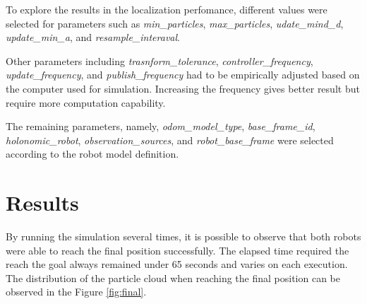 \documentclass[10pt,journal,compsoc]{IEEEtran}
\begin{document}
To explore the results in the localization perfomance, different values were selected for parameters such as \textit{min\_particles}, \textit{max\_particles}, \textit{udate\_mind\_d}, \textit{update\_min\_a}, and \textit{resample\_interaval}.

Other parameters including \textit{trasnform\_tolerance}, \textit{controller\_frequency}, \textit{update\_frequency}, and \textit{publish\_frequency} had to be empirically adjusted based on the computer used for simulation. Increasing the frequency gives better result but require more computation capability.

The remaining parameters, namely, \textit{odom\_model\_type}, \textit{base\_frame\_id}, \textit{holonomic\_robot}, \textit{observation\_sources}, and \textit{robot\_base\_frame} were selected according to the robot model definition.


\section{Results}
By running the simulation several times, it is possible to observe that both robots were able to reach the final position successfully. The elapsed time required the reach the goal always remained under 65 seconds and varies on each execution. The distribution of the particle cloud when reaching the final position can be observed in the Figure \ref{fig:final}. 
\end{document}
